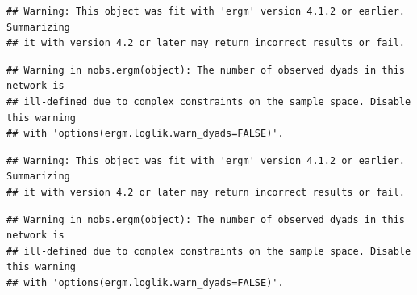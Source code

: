 \documentclass[
]{book}
\begin{document}
\begin{verbatim}
## Warning: This object was fit with 'ergm' version 4.1.2 or earlier. Summarizing
## it with version 4.2 or later may return incorrect results or fail.
\end{verbatim}

\begin{verbatim}
## Warning in nobs.ergm(object): The number of observed dyads in this network is
## ill-defined due to complex constraints on the sample space. Disable this warning
## with 'options(ergm.loglik.warn_dyads=FALSE)'.
\end{verbatim}

\begin{verbatim}
## Warning: This object was fit with 'ergm' version 4.1.2 or earlier. Summarizing
## it with version 4.2 or later may return incorrect results or fail.
\end{verbatim}

\begin{verbatim}
## Warning in nobs.ergm(object): The number of observed dyads in this network is
## ill-defined due to complex constraints on the sample space. Disable this warning
## with 'options(ergm.loglik.warn_dyads=FALSE)'.
\end{verbatim}
\end{document}
